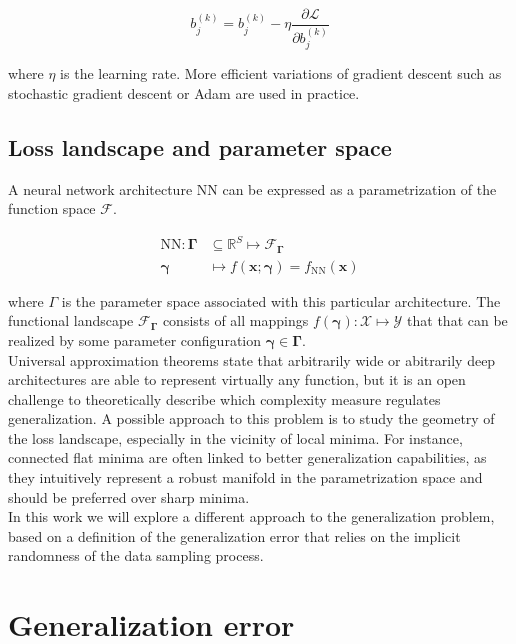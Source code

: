 $$
b_{j}^{(k)} = b_{j}^{(k)} -\eta \frac{\partial \mathcal{L}}{\partial b_{j}^{(k)}}
$$

where $\eta$ is the learning rate. More efficient variations of gradient descent such as stochastic gradient descent or Adam are used in practice.


\subsection{Loss landscape and parameter space}


A neural network architecture $\text{NN}$ can be expressed as a parametrization of the function space $\mathcal{F}$.

$$
    \begin{aligned}
        \text{NN}: \bm{\Gamma} & \subseteq \mathbb{R}^{S} \longmapsto \mathcal{F}_{\bm{\Gamma}} \\
        \bm{\gamma} & \longmapsto f(\bm{x}; \bm{\gamma}) = f_{\text{NN}}(\bm{x})
    \end{aligned}
$$

where $\Gamma$ is the parameter space associated with this particular architecture. The functional
landscape $\mathcal{F}_{\bm{\Gamma}}$ consists of all mappings $f(\bm{\gamma}): \mathcal{X} \longmapsto \mathcal{Y}$ that 
that can be realized by some parameter configuration $\bm{\gamma} \in \bm{\Gamma}$. \\

Universal approximation theorems state that arbitrarily wide or abitrarily deep architectures
are able to represent virtually any function, but it is an open challenge to theoretically describe which
complexity measure regulates generalization. A possible approach to this problem is to
study the geometry of the loss landscape, especially in the vicinity of local minima. For instance, 
connected flat minima are often linked to better generalization capabilities, as they
intuitively represent a robust manifold in the parametrization space and should be preferred over sharp minima. \\

In this work we will explore a different approach to the generalization problem, based on
a definition of the generalization error that relies on the implicit randomness of the
data sampling process. 

\section{Generalization error}

